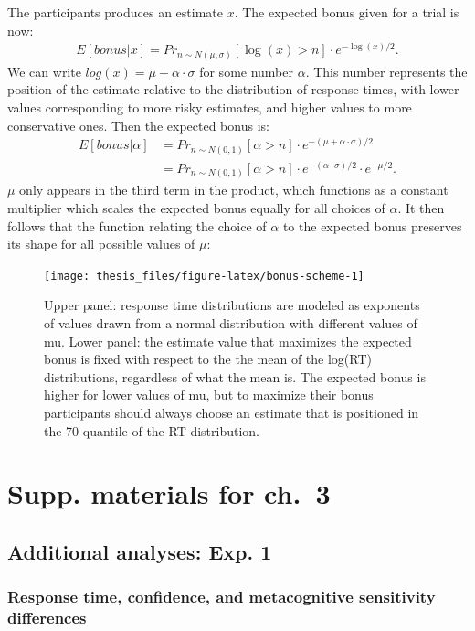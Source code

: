 \documentclass[12pt,twoside]{reedthesis}
\begin{document}
The participants produces an estimate \(x\). The expected bonus given for a trial is now:
\begin{align}
    E[bonus|x]=Pr_{n \sim N(\mu, \sigma)}[\log(x)>n] \cdot e^{-\log(x)/2}.
\end{align}
We can write \(log(x)=\mu+\alpha \cdot \sigma\) for some number \(\alpha\). This number represents the position of the estimate relative to the distribution of response times, with lower values corresponding to more risky estimates, and higher values to more conservative ones. Then the expected bonus is:
\begin{align}
    E[bonus|\alpha]&=Pr_{n \sim N(0, 1)}[\alpha>n] \cdot e^{-(\mu+\alpha \cdot \sigma)/2} \\ \nonumber
    &= Pr_{n \sim N(0, 1)}[\alpha>n] \cdot e^{-(\alpha \cdot \sigma)/2} \cdot e^{-\mu/2}. 
\end{align}
\(\mu\) only appears in the third term in the product, which functions as a constant multiplier which scales the expected bonus equally for all choices of \(\alpha\). It then follows that the function relating the choice of \(\alpha\) to the expected bonus preserves its shape for all possible values of \(\mu\):
\begin{figure}
\texttt{[image: thesis\_files/figure-latex/bonus-scheme-1]} \caption[bonus structure]{Upper panel: response time distributions are modeled as exponents of values drawn from a normal distribution with different values of mu. Lower panel: the estimate value that maximizes the expected bonus is fixed with respect to the the mean of the log(RT) distributions, regardless of what the mean is. The expected bonus is higher for lower values of mu, but to maximize their bonus participants should always choose an estimate that is positioned in the 70 quantile of the RT distribution.}\label{fig:bonus-scheme}
\end{figure}
\hypertarget{appRC-everything}{%
\chapter{Supp. materials for ch.~3}\label{appRC-everything}}

\hypertarget{additional-analyses-exp.-1}{%
\section{Additional analyses: Exp. 1}\label{additional-analyses-exp.-1}}

\hypertarget{appRC-asymmetries1}{%
\subsection{Response time, confidence, and metacognitive sensitivity differences}\label{appRC-asymmetries1}}
\end{document}

